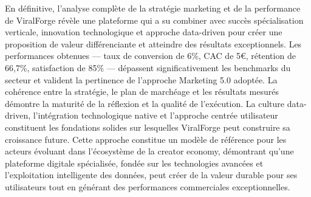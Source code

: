 En définitive, l'analyse complète de la stratégie marketing et de la performance de ViralForge révèle une plateforme qui a su combiner avec succès spécialisation verticale, innovation technologique et approche data-driven pour créer une proposition de valeur différenciante et atteindre des résultats exceptionnels. Les performances obtenues — taux de conversion de 6\%, CAC de 5€, rétention de 66,7\%, satisfaction de 85\% — dépassent significativement les benchmarks du secteur et valident la pertinence de l'approche Marketing 5.0 adoptée. La cohérence entre la stratégie, le plan de marchéage et les résultats mesurés démontre la maturité de la réflexion et la qualité de l'exécution. La culture data-driven, l'intégration technologique native et l'approche centrée utilisateur constituent les fondations solides sur lesquelles ViralForge peut construire sa croissance future. Cette approche constitue un modèle de référence pour les acteurs évoluant dans l'écosystème de la creator economy, démontrant qu'une plateforme digitale spécialisée, fondée sur les technologies avancées et l'exploitation intelligente des données, peut créer de la valeur durable pour ses utilisateurs tout en générant des performances commerciales exceptionnelles.

